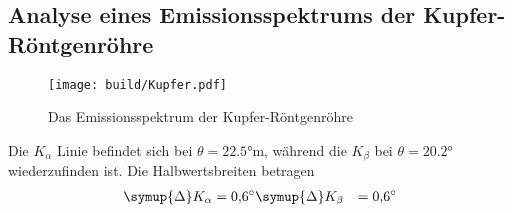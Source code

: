\subsection{Analyse eines Emissionsspektrums der Kupfer-Röntgenröhre}
\begin{figure}
    \centering
    \caption{Das Emissionsspektrum der Kupfer-Röntgenröhre}
    \label{fig:Kupfer}
    \texttt{[image: build/Kupfer.pdf]}
\end{figure}
Die $K_\alpha$ Linie befindet sich bei  $\theta = \ang{22.5;;}$m, während die $K_\beta$ bei  $\theta = \ang{20.2;;}$ wiederzufinden ist.
Die Halbwertsbreiten betragen
\begin{align*}
    \symup{\Delta}K_\alpha &= \ang{0.6;;} 
    \symup{\Delta}K_\beta &= \ang{0.6;;} 
\end{align*}
